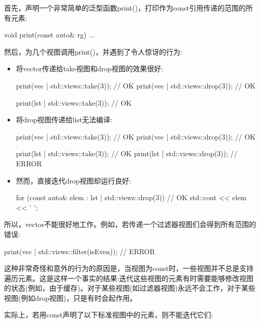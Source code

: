 首先，声明一个非常简单的泛型函数print()，打印作为const引用传递的范围的所有元素:

\begin{cpp}
void print(const auto& rg)
{
	...
}
\end{cpp}

然后，为几个视图调用print()，并遇到了令人惊讶的行为:


\begin{itemize}
\item
将vector传递给take视图和drop视图的效果很好:

\begin{cpp}
print(vec | std::views::take(3)); // OK
print(vec | std::views::drop(3)); // OK

print(lst | std::views::take(3)); // OK
\end{cpp}

\item
将drop视图传递给list无法编译:

\begin{cpp}
print(vec | std::views::take(3)); // OK
print(vec | std::views::drop(3)); // OK

print(lst | std::views::take(3)); // OK
print(lst | std::views::drop(3)); // ERROR
\end{cpp}

\item
然而，直接迭代drop视图却运行良好:

\begin{cpp}
for (const auto& elem : lst | std::views::drop(3)) { // OK
	std::cout << elem << ' ';
}
\end{cpp}
\end{itemize}

所以，vector不能很好地工作。例如，若传递一个过滤器视图们会得到所有范围的错误:

\begin{cpp}
print(vec | std::views::filter(isEven)); // ERROR
\end{cpp}


这种非常奇怪和意外的行为的原因是，当视图为const时，一些视图并不总是支持遍历元素。这是这样一个事实的结果:迭代这些视图的元素有时需要能够修改视图的状态(例如，由于缓存)。对于某些视图(如过滤器视图)永远不会工作，对于某些视图(例如drop视图)，只是有时会起作用。

实际上，若用const声明了以下标准视图中的元素，则不能迭代它们:

